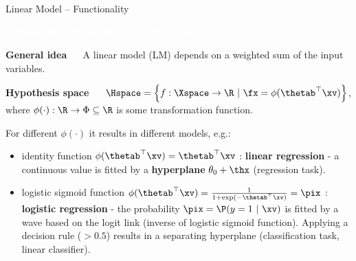 \documentclass[11pt,compress,t,notes=noshow, xcolor=table]{beamer}
\newcommand{\maketag}[1]{\colorbox{highlightcol}{\textcolor{white}
{\MakeUppercase{#1}}}}
\newcommand{\highlight}[1]{\textcolor{highlightcol}{\textbf{#1}}}
\begin{document}
\begin{frame}{Linear Model -- Functionality}

\footnotesize

\maketag{SUPERVISED}
\maketag{PARAMETRIC}
\maketag{WHITE-BOX}


\medskip


\highlight{General idea} ~~  
A linear model (LM) depends on a weighted sum of the input variables.



\medskip

\highlight{Hypothesis space} ~~
$\Hspace = \left\{f: \Xspace \to \R ~|~\fx = \phi(\thetab^\top \xv)\right\}$, 
where $\phi(\cdot): \R \to \Phi \subseteq \R$ is some transformation function.

\smallskip

For different $\phi(\cdot)$ it results in different models, e.g.: 
\begin{itemize}
  \item identity function $\phi(\thetab^\top \xv) = \thetab^\top \xv$ :  \textbf{linear regression} - a continuous value is fitted by a \textbf{hyperplane} $\theta_0 + \thx$ (regression task).
  \item logistic sigmoid function $\phi(\thetab^\top \xv) = \frac{1}{1 + \exp(- \thetab^\top \xv)} = \pix$ : \textbf{logistic regression} - the probability $\pix = \P(y = 1 ~|~\xv)$ is fitted by a wave based on the logit link (inverse of logistic sigmoid function). Applying a decision rule ($>0.5$) results in a separating hyperplane (classification task, linear classifier). 

\end{itemize}





\end{frame}
\end{document}
